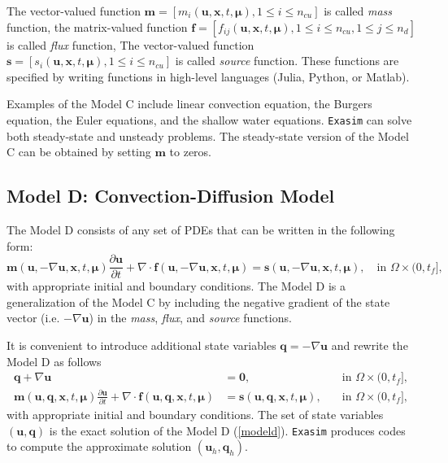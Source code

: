 \documentclass[11pt]{article}
\begin{document}
The vector-valued function  $\bm m = [m_i(\bm u, \bm x, t, \bm \mu), 1 \le i \le n_{cu} ]$ is called {\em mass} function, the matrix-valued function $\bm f = [f_{ij}(\bm u, \bm x, t, \bm \mu), 1 \le i \le n_{cu}, 1 \le j \le n_d]$ is called {\em flux} function, The vector-valued function  $\bm s = [s_i(\bm u, \bm x, t, \bm \mu), 1 \le i \le n_{cu} ]$ is called {\em source} function. These functions are specified by writing functions in high-level languages (Julia, Python, or Matlab).

Examples of the Model C include linear convection equation, the Burgers equation, the Euler equations, and the shallow water equations. \texttt{Exasim} can solve both steady-state and unsteady problems. The steady-state version of the Model C can be obtained by setting $\bm m$ to zeros. 

\subsection{Model D: Convection-Diffusion Model}

The Model D consists of any set of PDEs that can be written in the following form:
\begin{equation}
\label{modeld0}
\bm m(\bm{u}, - \nabla \bm u, \bm x,t, \bm \mu) \frac{\partial \bm{u}}{\partial t} + \nabla \cdot \bm{f}(\bm{u}, - \nabla \bm u, \bm x,t, \bm \mu) = \bm s(\bm{u}, - \nabla \bm u, \bm x,t, \bm \mu), \quad \mbox{in } \Omega \times (0, t_f], 
\end{equation}
with appropriate initial and boundary conditions. The Model D is a generalization of the Model C by including the negative gradient of the state vector (i.e. $- \nabla \bm u$) in the {\em mass}, {\em flux}, and {\em source} functions.

It is convenient to introduce additional state variables $\bm q = - \nabla \bm u$  and rewrite the Model D as follows
\begin{subequations}
\label{modeld}
\begin{alignat}{2}
\bm q + \nabla \bm u & =  \bm 0,  & \quad \mbox{in } \Omega \times (0, t_f], \\
\bm m(\bm{u}, \bm q, \bm x,t, \bm \mu) \frac{\partial \bm{u}}{\partial t} + \nabla \cdot \bm{f}(\bm{u}, \bm q, \bm x,t, \bm \mu) &=  \bm s(\bm{u}, \bm q, \bm x,t, \bm \mu), & \quad \mbox{in } \Omega \times (0, t_f], 
\end{alignat}
\end{subequations}
with appropriate initial and boundary conditions. The set of state variables $(\bm u, \bm q)$ is the exact solution of the Model D (\ref{modeld}). \texttt{Exasim} produces codes to compute the approximate solution $(\bm u_h, \bm q_h)$.
\end{document}

